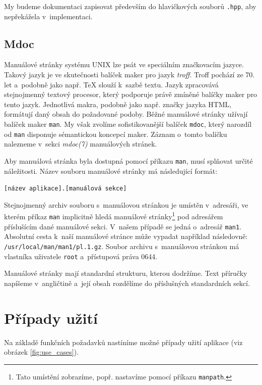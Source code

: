 \documentclass[thesis=B,czech,hidelinks]{thesis}[2012/06/26]
\begin{document}
My budeme dokumentaci zapisovat především do hlavičkových souborů \texttt{.hpp}, aby nepřekážela v~implementaci.

\subsection{Mdoc}

Manuálové stránky systému UNIX lze psát ve speciálním značkovacím jazyce. Takový jazyk je ve skutečnosti balíček maker pro jazyk \emph{troff}. Troff pochází ze 70. let a~podobně jako např. \TeX{} slouží k~sazbě textu. Jazyk zpracovává stejnojmenný textový procesor, který podporuje právě zmíněné balíčky maker pro tento jazyk. Jednotlivá makra, podobně jako např. značky jazyka HTML, formátují daný obsah do požadované podoby\cite{troff}. Běžné manuálové stránky užívají balíček maker \texttt{man}. My však zvolíme sofistikovanější balíček \texttt{mdoc}, který narozdíl od \texttt{man} disponuje sémantickou koncepcí maker. Záznam o~tomto balíčku nalezneme v~sekci \emph{mdoc(7)} manuálových stránek\cite{mdoc}.

Aby manuálová stránka byla dostupná pomocí příkazu \texttt{man}, musí splňovat určité náležitosti. Název souboru manuálové stránky má následující formát:

\begin{center}
\texttt{[název aplikace].[manuálová sekce]}
\end{center}

Stejnojmenný archiv souboru s~manuálovou stránkou je umístěn v~adresáři, ve kterém příkaz \texttt{man} implicitně hledá manuálové stránky\footnote{Tato umístění zobrazíme, popř. nastavíme pomocí příkazu \texttt{manpath}.} pod adresářem příslušícím dané manuálové sekci. V~našem případě se jedná o~adresář \texttt{man1}. Absolutní cesta k~naší manuálové stránce může vypadat například následovně: \texttt{/usr/local/man/man1/pl.1.gz}. Soubor archivu s~manuálovou stránkou má vlastníka uživatele \texttt{root} a~přístupová práva 0644.

Manuálové stránky mají standardní strukturu, kterou dodržíme. Text příručky napíšeme v~angličtině a~její obsah rozdělíme do příslušných standardních sekcí.

\section{Případy užití}

Na základě funkčních požadavků nastíníme možné případy užití aplikace (viz obrázek \ref{fig:use_cases}).
\end{document}
